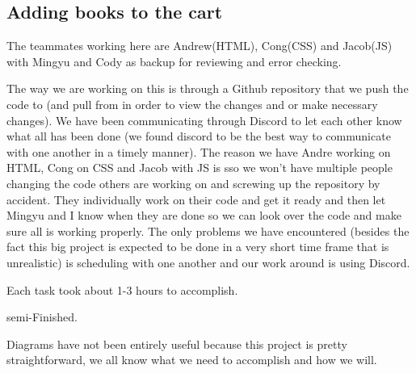 \documentclass[12pt]{article}
\begin{document}
		\subsection{Adding books to the cart}
		\begin{iterate}

		\item The teammates working here are Andrew(HTML), Cong(CSS) and Jacob(JS) with Mingyu and Cody as backup for reviewing and error checking.

		\item The way we are working on this is through a Github repository that we push the code to (and pull from in order to view the changes and or make necessary changes).  We have been communicating through Discord to let each other know what all has been done (we found discord to be the best way to communicate with one another in a timely manner).  The reason we have Andre working on HTML, Cong on CSS and Jacob with JS is sso we won’t have multiple people changing the code others are working on and screwing up the repository by accident.  They individually work on their code and get it ready and then let Mingyu and I know when they are done so we can look over the code and make sure all is working properly.  The only problems we have encountered (besides the fact this big project is expected to be done in a very short time frame that is unrealistic) is scheduling with one another and our work around is using Discord.

		\item Each task took about 1-3 hours to accomplish.

		\item semi-Finished.

		\item Diagrams have not been entirely useful because this project is pretty straightforward, we all know what we need to accomplish and how we will.

		\end{iterate}
\end{document}
